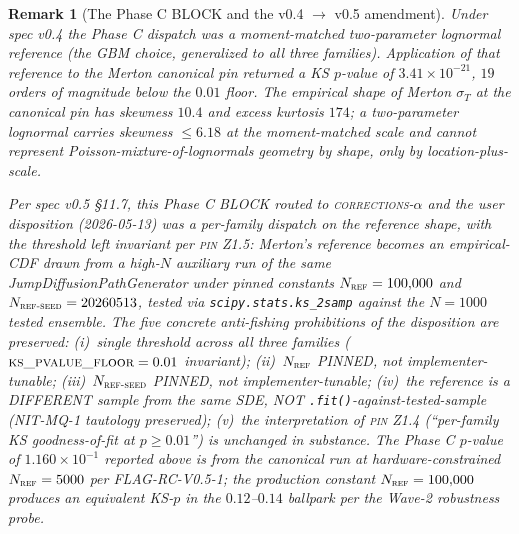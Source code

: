 \documentclass[11pt,letterpaper]{article}
\newtheorem{remark}{Remark}[section]
\newcommand{\sigmaT}{\sigma_{T}}
\newcommand{\PinZ}[1]{\textsc{pin Z1.#1}}
\begin{document}
\begin{remark}[The Phase C BLOCK and the v0.4 $\to$ v0.5 amendment]
\label{rem:merton:ecdf}
Under spec v0.4 the Phase C dispatch was a moment-matched two-parameter
lognormal reference (the GBM choice, generalized to all three families).
Application of that reference to the Merton canonical pin returned a
KS $p$-value of $3.41\times 10^{-21}$, $19$ orders of magnitude below the
$0.01$ floor. The empirical shape of Merton $\sigmaT$ at the canonical
pin has skewness $10.4$ and excess kurtosis $174$; a two-parameter
lognormal carries skewness $\leq 6.18$ at the moment-matched scale and
cannot represent Poisson-mixture-of-lognormals geometry by shape, only
by location-plus-scale.

Per spec v0.5 \S11.7, this Phase C BLOCK routed to \textsc{corrections-$\alpha$}
and the user disposition (2026-05-13) was a per-family dispatch on the
reference \emph{shape}, with the threshold left invariant per \PinZ{5}:
Merton's reference becomes an empirical-CDF drawn from a high-$N$
auxiliary run of the same \textsf{JumpDiffusionPathGenerator} under
pinned constants $N_{\textsc{ref}} = 100{,}000$ and
$N_{\textsc{ref-seed}} = 20260513$, tested via
\texttt{scipy.stats.ks\_2samp} against the $N = 1000$ tested ensemble.
The five concrete anti-fishing prohibitions of the disposition are
preserved: (i)~single threshold across all three families
($\textsc{ks\_pvalue\_floor} = 0.01$ invariant); (ii)~$N_{\textsc{ref}}$
PINNED, not implementer-tunable; (iii)~$N_{\textsc{ref-seed}}$ PINNED,
not implementer-tunable; (iv)~the reference is a DIFFERENT
sample from the same SDE, NOT \texttt{.fit()}-against-tested-sample
(NIT-MQ-1 tautology preserved); (v)~the interpretation of \PinZ{4}
(``per-family KS goodness-of-fit at $p \geq 0.01$'') is unchanged in
substance. The Phase C $p$-value of $1.160\times 10^{-1}$ reported above
is from the canonical run at hardware-constrained $N_{\textsc{ref}} =
5000$ per FLAG-RC-V0.5-1; the production constant $N_{\textsc{ref}} =
100{,}000$ produces an equivalent KS-$p$ in the $0.12$--$0.14$
ballpark per the Wave-2 robustness probe.
\end{remark}
\end{document}
